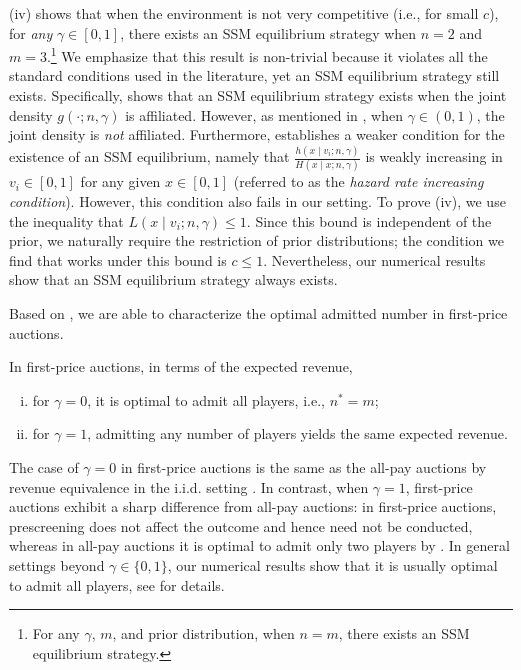  (iv) shows that when the environment is not very competitive (i.e., for small $c$), for \textit{any} $\gamma\in[0,1]$, there exists an SSM equilibrium strategy when $n=2$ and $m=3$.\footnote{For any $\gamma$, $m$, and prior distribution, when $n=m$, there exists an SSM equilibrium strategy.} We emphasize that this result is non-trivial because it violates all the standard conditions used in the literature, yet an SSM equilibrium strategy still exists. Specifically, \citet{milgrom_1982_auctiontheory_competitive_bidding} shows that an SSM equilibrium strategy exists when the joint density $g(\cdot;n,\gamma)$ is affiliated. However, as mentioned in , when $\gamma\in (0,1)$, the joint density is \textit{not} affiliated. Furthermore, \citet{castro_2007_affiliation_positive_dependence} establishes a weaker condition for the existence of an SSM equilibrium, namely that $\frac{h(x\mid v_i;n,\gamma)}{H(x\mid x;n,\gamma)}$ is weakly increasing in $v_i\in [0,1]$ for any given $x\in [0,1]$ (referred to as the \textit{hazard rate increasing condition}). However, this condition also fails in our setting. 
To prove  (iv), we use the inequality that $L(x\mid v_i;n,\gamma)\leq 1$.
Since this bound is independent of the prior, we naturally require the restriction of prior distributions; the condition we find that works under this bound is $c\leq 1$. Nevertheless, our numerical results show that an SSM equilibrium strategy always exists.




Based on , we are able to characterize the optimal admitted number in first-price auctions.

\begin{theorem}
\label{thm:opt_admittednumber_firstprice}
In first-price auctions, in terms of the expected revenue, 
\begin{enumerate}[(i)]
    \item for $\gamma=0$, it is optimal to admit all players, i.e., $n^\ast=m$; 
    \item for $\gamma=1$, admitting any number of players yields the same expected revenue.
\end{enumerate}
\end{theorem}

The case of $\gamma=0$ in first-price auctions is the same as the all-pay auctions by revenue equivalence in the i.i.d. setting \citep{myerson_1981_optimal_auction}. In contrast, when $\gamma=1$, first-price auctions exhibit a sharp difference from all-pay auctions: in first-price auctions, prescreening does not affect the outcome and hence need not be conducted, whereas in all-pay auctions it is optimal to admit only two players by .
In general settings beyond $\gamma\in \{0,1\}$, our numerical results show that it is usually optimal to admit all players, see  for details. 



